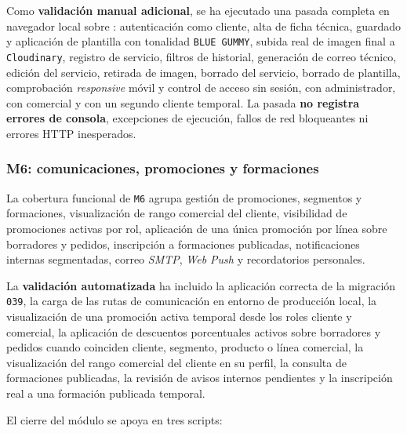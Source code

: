 Como \textbf{validación manual adicional}, se ha ejecutado una pasada completa en navegador local sobre : autenticación como cliente, alta de ficha técnica, guardado y aplicación de plantilla con tonalidad \texttt{BLUE GUMMY}, subida real de imagen final a \texttt{Cloudinary}, registro de servicio, filtros de historial, generación de correo técnico, edición del servicio, retirada de imagen, borrado del servicio, borrado de plantilla, comprobación \textit{responsive} móvil y control de acceso sin sesión, con administrador, con comercial y con un segundo cliente temporal. La pasada \textbf{no registra errores de consola}, excepciones de ejecución, fallos de red bloqueantes ni errores HTTP inesperados.

\subsubsection{M6: comunicaciones, promociones y formaciones}

La cobertura funcional de \texttt{M6} agrupa gestión de promociones, segmentos y formaciones, visualización de rango comercial del cliente, visibilidad de promociones activas por rol, aplicación de una única promoción por línea sobre borradores y pedidos, inscripción a formaciones publicadas, notificaciones internas segmentadas, correo \textit{SMTP}, \textit{Web Push} y recordatorios personales.

La \textbf{validación automatizada} ha incluido la aplicación correcta de la migración \texttt{039}, la carga de las rutas de comunicación en entorno de producción local, la visualización de una promoción activa temporal desde los roles cliente y comercial, la aplicación de descuentos porcentuales activos sobre borradores y pedidos cuando coinciden cliente, segmento, producto o línea comercial, la visualización del rango comercial del cliente en su perfil, la consulta de formaciones publicadas, la revisión de avisos internos pendientes y la inscripción real a una formación publicada temporal.

El cierre del módulo se apoya en tres scripts:

